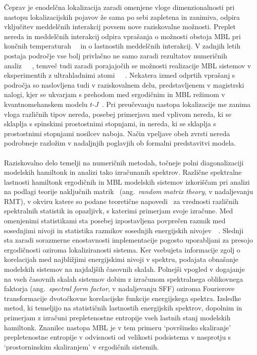  Čeprav je enodelčna lokalizacija zaradi omenjene  vloge dimenzionalnosti pri nastopu lokalizacijskih pojavov že sama po sebi zapletena in zanimiva, odpira vključitev meddelčnih interakcij povsem nove raziskovalne možnosti. Preplet nereda in meddelčnih interakcij odpira vprašanja o možnosti obstoja MBL pri končnih temperaturah~\cite{basko2006metal}~\cite{PhysRevB.75.155111} in o lastnostih meddelčnih interakcij. V zadnjih letih postaja področje vse bolj privlačno ne samo zaradi rezultatov numeričnih analiz~\cite{vznidarivc2008many}~\cite{PhysRevB.75.155111}~\cite{PhysRevA.92.041601}, temveč tudi zaradi porajajočih se možnosti realizacije MBL sistemov v eksperimentih z ultrahladnimi atomi~\cite{PhysRevLett.114.083002}~\cite{schreiber2015observation}~\cite{PhysRevLett.116.140401}. Nekatera izmed odprtih vprašanj s področja so naslovljena tudi v raziskovalnem delu, predstavljenem v magistrski nalogi, kjer se ukvarjam s prehodom med ergodičnim in MBL režimom v kvantnomehanskem modelu $t$-$J$~\cite{spalek2007tj}. Pri preučevanju nastopa lokalizacije me zanima vloga različnih tipov nereda, posebej primerjava med vplivom nereda, ki se sklaplja s spinskimi prostostnimi stopnjami, in nereda, ki se sklaplja s prostostnimi stopnjami nosilcev naboja. Način vpeljave obeh zvrsti nereda podrobneje razložim v nadaljnjih poglavjih ob formalni predstavitvi modela.
  \\\\Raziskovalno delo temelji na numeričnih metodah, točneje polni diagonalizaciji modelskih hamiltonk in 
  analizi tako izračunanih spektrov.  Različne spektralne lastnosti hamiltonk ergodičnih in MBL modelskih sistemov izkoriščam pri analizi na podlagi teorije naključnih matrik~\cite{d2016quantum} (ang.~\emph{random matrix theory}, v nadaljevanju RMT), v okviru katere so podane teoretične napovedi~\cite{mehta2004random} za vrednosti različnih spektralnih statistik in opazljivk, s katerimi primerjam svoje izračune. Med omenjenimi statistikami sta posebej izpostavljena povprečen razmik med sosednjimi nivoji in statistika razmikov sosednjih energijskih nivojev~\cite{Atas_Distribution_PhysRevLett.110.084101}~\cite{PhysRevB.75.155111}. Slednji sta zaradi sorazmerne enostavnosti implementacije pogosto uporabljani za presojo ergodičnosti oziroma lokaliziranosti sistema. Ker vsebujeta informacije zgolj o korelacijah med najbližjimi energijskimi nivoji v spektru, podajata obnašanje modelskih sistemov na najdaljših časovnih skalah. Polnejši vpogled v dogajanje na vseh časovnih skalah sistemov dobim z izračunom spektralnega oblikovnega faktorja (ang.~\emph{spectral form factor}, v nadaljevanju SFF) oziroma Fourierove transformacije dvotočkovne korelacijske funkcije energijskega spektra. Izsledke metod, ki temeljijo na statističnih lastnostih energijskih spektrov, dopolnim in primerjam z izračuni prepletenostne entropije vseh lastnih stanj modelskih hamiltonk. Znanilec nastopa MBL je v tem primeru `površinsko skaliranje' prepletenostne entropije v odvisnosti od velikosti podsistema v nasprotju s `prostorninskim skaliranjem' v ergodičnih sistemih. \\\\

